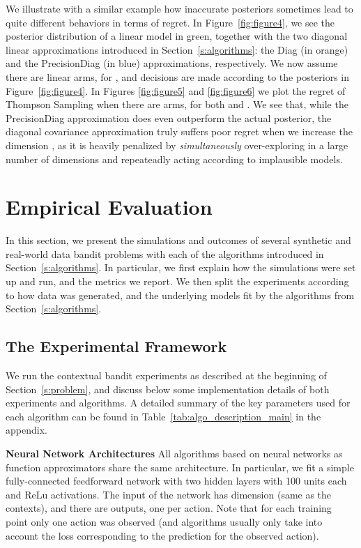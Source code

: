 \documentclass{article} \usepackage{iclr2018_conference,times}
\begin{document}
We illustrate with a similar example how inaccurate posteriors sometimes lead to quite different behaviors in terms of regret.
In Figure~\ref{fig:figure4}, we see the posterior distribution  of a linear model in green, together with the two diagonal linear approximations introduced in Section~\ref{s:algorithms}: the Diag (in orange) and the PrecisionDiag (in blue) approximations, respectively.
We now assume there are  linear arms,  for , and decisions are made according to the posteriors in Figure~\ref{fig:figure4}.
In Figures \ref{fig:figure5} and \ref{fig:figure6} we plot the regret of Thompson Sampling when there are  arms, for both  and .
We see that, while the PrecisionDiag approximation does even outperform the actual posterior, the diagonal covariance approximation truly suffers poor regret when we increase the dimension , as it is heavily penalized by \emph{simultaneously} over-exploring in a large number of dimensions and repeateadly acting according to implausible models.


 \section{Empirical Evaluation}\label{s:experiments}

In this section, we present the simulations and outcomes of several synthetic and real-world data bandit problems with each of the algorithms introduced in Section~\ref{s:algorithms}.
In particular, we first explain how the simulations were set up and run, and the metrics we report.
We then split the experiments according to how data was generated, and the underlying models fit by the algorithms from Section~\ref{s:algorithms}.






\subsection{The Experimental Framework}
We run the contextual bandit experiments as described at the beginning of Section~\ref{s:problem}, and discuss below some implementation details of both experiments and algorithms.
A detailed summary of the key parameters used for each algorithm can be found in Table~\ref{tab:algo_description_main} in the appendix.



\textbf{Neural Network Architectures}
All algorithms based on neural networks as function approximators share the same architecture.
In particular, we fit a simple fully-connected feedforward network with two hidden layers with 100 units each and ReLu activations.
The input of the network has dimension  (same as the contexts), and there are  outputs, one per action.
Note that for each training point  only one action was observed (and algorithms usually only take into account the loss corresponding to the prediction for the observed action).
\end{document}
